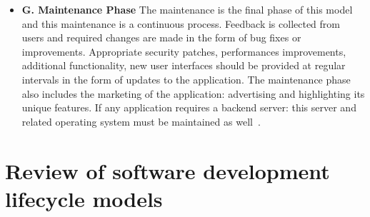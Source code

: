 \documentclass[10pt,slovak,a4paper]{article}
\begin{document}
\begin{itemize}
  \item \textbf{G. Maintenance Phase}
The maintenance is the final phase of this model and this maintenance is a continuous process. Feedback is collected from users and required changes are made in the form of bug fixes or improvements. Appropriate security patches, performances improvements, additional functionality, new user interfaces should be provided at regular intervals in the form of updates to the application. The maintenance phase also includes the marketing of the application: advertising and highlighting its unique features. If any application requires a backend server: this server and related operating system must be maintained as well~\cite{vithani2014modeling}.
\end{itemize}

\section{Review of software development lifecycle models}


\end{document}
